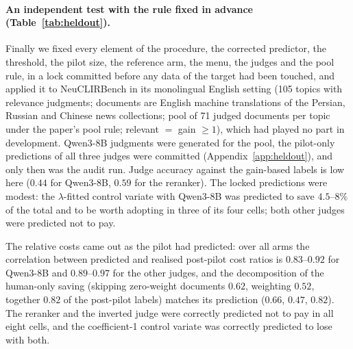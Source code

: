 \documentclass{article}
\begin{document}
\paragraph{An independent test with the rule fixed in advance (Table~\ref{tab:heldout}).} Finally we fixed every element of the procedure, the corrected predictor, the threshold, the pilot size, the reference arm, the menu, the judges and the pool rule, in a lock committed before any data of the target had been touched, and applied it to NeuCLIRBench \citep{lawrie2025neuclirbench} in its monolingual English setting (105 topics with relevance judgments; documents are English machine translations of the Persian, Russian and Chinese news collections; pool of 71 judged documents per topic under the paper's pool rule; relevant $=$ gain $\ge1$), which had played no part in development. Qwen3-8B judgments were generated for the pool, the pilot-only predictions of all three judges were committed (Appendix~\ref{app:heldout}), and only then was the audit run. Judge accuracy against the gain-based labels is low here ($0.44$ for Qwen3-8B, $0.59$ for the reranker). The locked predictions were modest: the $\lambda$-fitted control variate with Qwen3-8B was predicted to save $4.5$--$8\%$ of the total and to be worth adopting in three of its four cells; both other judges were predicted not to pay.

The relative costs came out as the pilot had predicted: over all arms the correlation between predicted and realised post-pilot cost ratios is $0.83$--$0.92$ for Qwen3-8B and $0.89$--$0.97$ for the other judges, and the decomposition of the human-only saving (skipping zero-weight documents $0.62$, weighting $0.52$, together $0.82$ of the post-pilot labels) matches its prediction ($0.66$, $0.47$, $0.82$). The reranker and the inverted judge were correctly predicted not to pay in all eight cells, and the coefficient-1 control variate was correctly predicted to lose with both.
\end{document}
